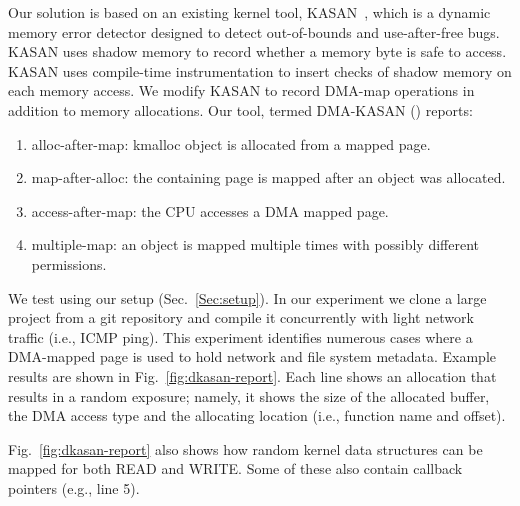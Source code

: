 Our solution is based on an existing kernel tool, KASAN~\cite{kasan}, which is a dynamic memory error detector designed to detect out-of-bounds and use-after-free bugs. KASAN uses shadow memory to record whether a memory byte is safe to access. KASAN uses compile-time instrumentation to insert checks of shadow memory on each memory access. 
We modify KASAN to record DMA-map operations in addition to memory allocations. Our tool, termed DMA-KASAN (\dkasan) reports: 
\begin{enumerate}
    \item alloc-after-map:  kmalloc object is allocated from a mapped page.
    \item map-after-alloc:  the containing page is mapped after an object was allocated.
    \item access-after-map: the CPU accesses a DMA mapped page.
    \item multiple-map: an object is mapped multiple times with possibly different permissions.
\end{enumerate}
We test \dkasan using our setup (Sec.~\ref{Sec:setup}).
In our experiment we clone a large project from a git repository and compile it concurrently with light network traffic (i.e., ICMP ping). This experiment identifies numerous cases where a DMA-mapped page is used to hold network and file system metadata. Example results are shown in Fig.~\ref{fig:dkasan-report}. Each line shows an allocation that results in a random exposure; namely, it shows the size of the allocated buffer, the DMA access type and the allocating location (i.e., function name and offset).

Fig.~\ref{fig:dkasan-report} also shows how random kernel data structures can be mapped for both READ and WRITE. Some of these also contain callback pointers (e.g., line 5). 
 
